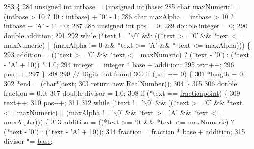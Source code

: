 \begin{DoxyCode}
283 \{
284     \textcolor{keywordtype}{unsigned} \textcolor{keywordtype}{int} intbase = (\textcolor{keywordtype}{unsigned} int)\hyperlink{classPositionalNumeralSystem_a50cd19222978e16cc9c8b481c72c4662}{base};
285     \textcolor{keywordtype}{char} maxNumeric = (intbase > 10 ? 10 : intbase) + \textcolor{charliteral}{'0'} - 1;
286     \textcolor{keywordtype}{char} maxAlpha = intbase > 10 ? intbase + \textcolor{charliteral}{'A'} - 11 : 0;
287 
288     \textcolor{keywordtype}{unsigned} \textcolor{keywordtype}{int} pos = 0;
289     \textcolor{keywordtype}{double} integer = 0;
290     \textcolor{keywordtype}{double} addition;
291 
292     \textcolor{keywordflow}{while} (*text != \textcolor{charliteral}{'\(\backslash\)0'} && ((*text >= \textcolor{charliteral}{'0'} && *text <= maxNumeric) || (maxAlpha != 0 && *text >= \textcolor{charliteral}{'A'} && *
      text <= maxAlpha))) \{
293         addition = ((*text >= \textcolor{charliteral}{'0'} && *text <= maxNumeric) ? (*text - \textcolor{charliteral}{'0'}) : (*text - \textcolor{charliteral}{'A'} + 10)) * 1.0;
294         integer = integer * \hyperlink{classPositionalNumeralSystem_a50cd19222978e16cc9c8b481c72c4662}{base} + addition;
295         text++;
296         pos++;
297     \}
298 
299     \textcolor{comment}{// Digits not found}
300     \textcolor{keywordflow}{if} (pos == 0) \{
301         *length = 0;
302         *end = (\textcolor{keywordtype}{char}*)text;
303         \textcolor{keywordflow}{return} \textcolor{keyword}{new} \hyperlink{structRealNumber}{RealNumber}();
304     \}
305 
306     \textcolor{keywordtype}{double} fraction = 0.0;
307     \textcolor{keywordtype}{double} divisor = 1.0;
308     \textcolor{keywordflow}{if} (*text == \hyperlink{classPositionalNumeralSystem_ad986e454b020c21e70f2efbc3682e44f}{fractionpoint}) \{
309         text++;
310         pos++;
311 
312         \textcolor{keywordflow}{while} (*text != \textcolor{charliteral}{'\(\backslash\)0'} && ((*text >= \textcolor{charliteral}{'0'} && *text <= maxNumeric) || (maxAlpha != \textcolor{charliteral}{'\(\backslash\)0'} && *text >= \textcolor{charliteral}{'A'}
       && *text <= maxAlpha))) \{
313             addition = ((*text >= \textcolor{charliteral}{'0'} && *text <= maxNumeric) ? (*text - \textcolor{charliteral}{'0'}) : (*text - \textcolor{charliteral}{'A'} + 10));
314             fraction = fraction * \hyperlink{classPositionalNumeralSystem_a50cd19222978e16cc9c8b481c72c4662}{base} + addition;
315             divisor *= \hyperlink{classPositionalNumeralSystem_a50cd19222978e16cc9c8b481c72c4662}{base};

\end{DoxyCode}
